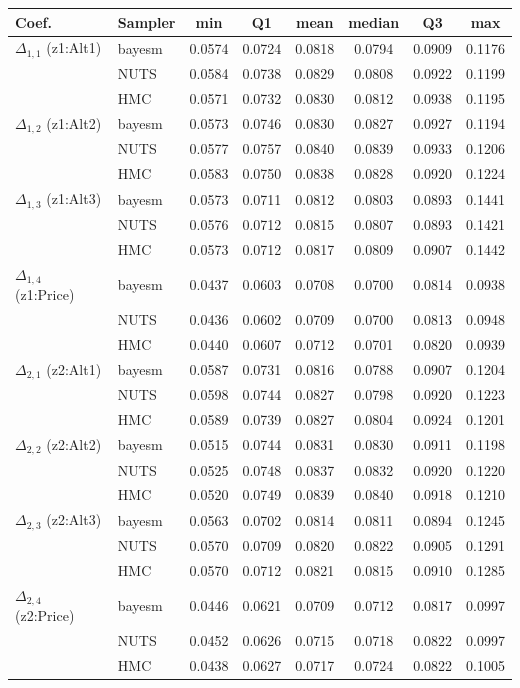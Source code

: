 \begin{tabular}{llcccccc}
\toprule
Coef. & Sampler & min & Q1 & mean & median & Q3 & max \\
\midrule
$\Delta_{1,1}$ (z1:Alt1) & bayesm & 0.0574 & 0.0724 & 0.0818 & 0.0794 & 0.0909 & 0.1176 \\
 & NUTS & 0.0584 & 0.0738 & 0.0829 & 0.0808 & 0.0922 & 0.1199 \\
 & HMC & 0.0571 & 0.0732 & 0.0830 & 0.0812 & 0.0938 & 0.1195 \\
$\Delta_{1,2}$ (z1:Alt2) & bayesm & 0.0573 & 0.0746 & 0.0830 & 0.0827 & 0.0927 & 0.1194 \\
 & NUTS & 0.0577 & 0.0757 & 0.0840 & 0.0839 & 0.0933 & 0.1206 \\
 & HMC & 0.0583 & 0.0750 & 0.0838 & 0.0828 & 0.0920 & 0.1224 \\
$\Delta_{1,3}$ (z1:Alt3) & bayesm & 0.0573 & 0.0711 & 0.0812 & 0.0803 & 0.0893 & 0.1441 \\
 & NUTS & 0.0576 & 0.0712 & 0.0815 & 0.0807 & 0.0893 & 0.1421 \\
 & HMC & 0.0573 & 0.0712 & 0.0817 & 0.0809 & 0.0907 & 0.1442 \\
$\Delta_{1,4}$ (z1:Price) & bayesm & 0.0437 & 0.0603 & 0.0708 & 0.0700 & 0.0814 & 0.0938 \\
 & NUTS & 0.0436 & 0.0602 & 0.0709 & 0.0700 & 0.0813 & 0.0948 \\
 & HMC & 0.0440 & 0.0607 & 0.0712 & 0.0701 & 0.0820 & 0.0939 \\
$\Delta_{2,1}$ (z2:Alt1) & bayesm & 0.0587 & 0.0731 & 0.0816 & 0.0788 & 0.0907 & 0.1204 \\
 & NUTS & 0.0598 & 0.0744 & 0.0827 & 0.0798 & 0.0920 & 0.1223 \\
 & HMC & 0.0589 & 0.0739 & 0.0827 & 0.0804 & 0.0924 & 0.1201 \\
$\Delta_{2,2}$ (z2:Alt2) & bayesm & 0.0515 & 0.0744 & 0.0831 & 0.0830 & 0.0911 & 0.1198 \\
 & NUTS & 0.0525 & 0.0748 & 0.0837 & 0.0832 & 0.0920 & 0.1220 \\
 & HMC & 0.0520 & 0.0749 & 0.0839 & 0.0840 & 0.0918 & 0.1210 \\
$\Delta_{2,3}$ (z2:Alt3) & bayesm & 0.0563 & 0.0702 & 0.0814 & 0.0811 & 0.0894 & 0.1245 \\
 & NUTS & 0.0570 & 0.0709 & 0.0820 & 0.0822 & 0.0905 & 0.1291 \\
 & HMC & 0.0570 & 0.0712 & 0.0821 & 0.0815 & 0.0910 & 0.1285 \\
$\Delta_{2,4}$ (z2:Price) & bayesm & 0.0446 & 0.0621 & 0.0709 & 0.0712 & 0.0817 & 0.0997 \\
 & NUTS & 0.0452 & 0.0626 & 0.0715 & 0.0718 & 0.0822 & 0.0997 \\
 & HMC & 0.0438 & 0.0627 & 0.0717 & 0.0724 & 0.0822 & 0.1005 \\
\bottomrule
\end{tabular}
